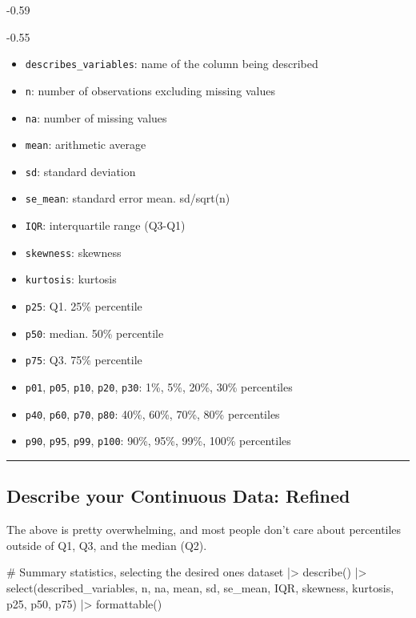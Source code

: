 \documentclass[
  letterpaper,
  DIV=11,
  numbers=noendperiod]{scrreprt}
\newenvironment{Shaded}{\begin{snugshade}}{\end{snugshade}}
\newcommand{\CommentTok}[1]{\textcolor[rgb]{0.37,0.37,0.37}{#1}}
\newcommand{\FunctionTok}[1]{\textcolor[rgb]{0.28,0.35,0.67}{#1}}
\newcommand{\NormalTok}[1]{\textcolor[rgb]{0.00,0.23,0.31}{#1}}
\newcommand{\SpecialCharTok}[1]{\textcolor[rgb]{0.37,0.37,0.37}{#1}}
\providecommand{\tightlist}{%
  \setlength{\itemsep}{0pt}\setlength{\parskip}{0pt}}\usepackage{longtable,booktabs,array}
\begin{document}
-0.59

-0.55

\begin{itemize}
\tightlist
\item
  \texttt{describes\_variables}: name of the column being described
\item
  \texttt{n}: number of observations excluding missing values
\item
  \texttt{na}: number of missing values
\item
  \texttt{mean}: arithmetic average
\item
  \texttt{sd}: standard deviation
\item
  \texttt{se\_mean}: standard error mean. sd/sqrt(n)
\item
  \texttt{IQR}: interquartile range (Q3-Q1)
\item
  \texttt{skewness}: skewness
\item
  \texttt{kurtosis}: kurtosis
\item
  \texttt{p25}: Q1. 25\% percentile
\item
  \texttt{p50}: median. 50\% percentile
\item
  \texttt{p75}: Q3. 75\% percentile
\item
  \texttt{p01}, \texttt{p05}, \texttt{p10}, \texttt{p20}, \texttt{p30}:
  1\%, 5\%, 20\%, 30\% percentiles
\item
  \texttt{p40}, \texttt{p60}, \texttt{p70}, \texttt{p80}: 40\%, 60\%,
  70\%, 80\% percentiles
\item
  \texttt{p90}, \texttt{p95}, \texttt{p99}, \texttt{p100}: 90\%, 95\%,
  99\%, 100\% percentiles
\end{itemize}

\begin{center}\rule{0.5\linewidth}{0.5pt}\end{center}

\hypertarget{describe-your-continuous-data-refined}{%
\subsection{Describe your Continuous Data:
Refined}\label{describe-your-continuous-data-refined}}

The above is pretty overwhelming, and most people don't care about
percentiles outside of Q1, Q3, and the median (Q2).

\begin{Shaded}
\begin{Highlighting}[]
\CommentTok{\# Summary statistics, selecting the desired ones}
\NormalTok{dataset }\SpecialCharTok{|\textgreater{}}
  \FunctionTok{describe}\NormalTok{() }\SpecialCharTok{|\textgreater{}}
  \FunctionTok{select}\NormalTok{(described\_variables, n, na, mean, sd, se\_mean, IQR, skewness, kurtosis, p25, p50, p75) }\SpecialCharTok{|\textgreater{}}
  \FunctionTok{formattable}\NormalTok{()}
\end{Highlighting}
\end{Shaded}
\end{document}
